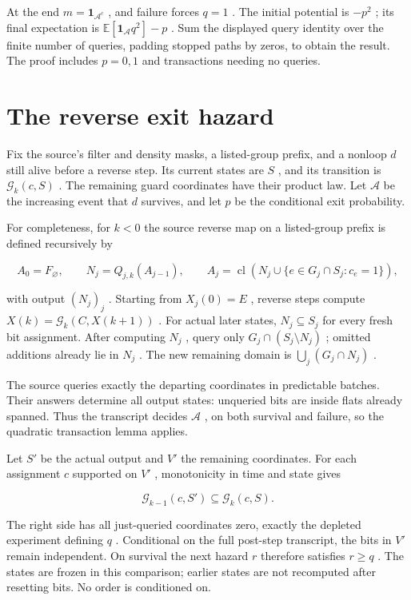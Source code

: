 \documentclass[11pt]{article}
\begin{document}
At the end \(m=\mathbf 1_{\mathcal A^c}\) , and failure forces \(q=1\) . The initial potential is \(-p^2\) ; its final expectation is \(\mathbb{E}[\mathbf 1_{\mathcal A}q^2]-p\) . Sum the displayed query identity over the finite number of queries, padding stopped paths by zeros, to obtain the result. The proof includes \(p=0,1\) and transactions needing no queries.

\section{The reverse exit hazard}\label{the-reverse-exit-hazard}

Fix the source's filter and density masks, a listed-group prefix, and a nonloop \(d\) still alive before a reverse step. Its current states are \(S\) , and its transition is \(\mathcal G_k(c,S)\) . The remaining guard coordinates have their product law. Let \(\mathcal A\) be the increasing event that \(d\) survives, and let \(p\) be the conditional exit probability.

For completeness, for \(k<0\) the source reverse map on a listed-group prefix is defined recursively by

\[A_0=F_{\varnothing},\qquad N_j=Q_{j,k}(A_{j-1}),\qquad
 A_j=\operatorname{cl}(N_j\cup\{e\in G_j\cap S_j:c_e=1\}),\]

with output \((N_j)_j\) . Starting from \(X_j(0)=E\) , reverse steps compute \(X(k)=\mathcal G_k(C,X(k+1))\) . For actual later states, \(N_j\subseteq S_j\) for every fresh bit assignment. After computing \(N_j\) , query only \(G_j\cap(S_j\setminus N_j)\) ; omitted additions already lie in \(N_j\) . The new remaining domain is \(\bigcup_j(G_j\cap N_j)\) .

The source queries exactly the departing coordinates in predictable batches. Their answers determine all output states: unqueried bits are inside flats already spanned. Thus the transcript decides \(\mathcal A\) , on both survival and failure, so the quadratic transaction lemma applies.

Let \(S'\) be the actual output and \(V'\) the remaining coordinates. For each assignment \(c\) supported on \(V'\) , monotonicity in time and state gives

\[\mathcal G_{k-1}(c,S')\subseteq\mathcal G_k(c,S).\]

The right side has all just-queried coordinates zero, exactly the depleted experiment defining \(q\) . Conditional on the full post-step transcript, the bits in \(V'\) remain independent. On survival the next hazard \(r\) therefore satisfies \(r\ge q\) . The states are frozen in this comparison; earlier states are not recomputed after resetting bits. No order is conditioned on.
\end{document}

